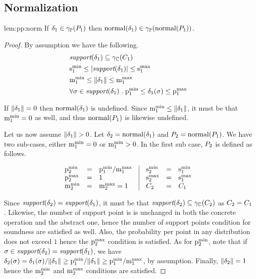 \subsection{Normalization}
\begin{replemma}{lem:pp:norm}
If $\delta_1 \in \gamma_{\mathbb{P}}(P_{1})$ then $\text{normal}(\delta_1) \in \gamma_{\mathbb{P}}(\text{normal}(P_{1}))$.
\end{replemma}

\begin{proof} By assumption we have the following.
\begin{align*}
& \textit{support}(\delta_1) \subseteq \gamma_{\mathbb{C}}(C_1) \\
& \mathrm{s}^\mathrm{min}_{1} \leq \left| \textit{support}(\delta_1) \right| \leq \mathrm{s}^\mathrm{max}_{1} \\
& \mathrm{m}^\mathrm{min}_{1} \leq \mathord{\parallel}\delta_1\mathord{\parallel} \leq \mathrm{m}^\mathrm{max}_{1} \\
& \forall \sigma \in \textit{support}(\delta_1) \;
. \; \mathrm{p}^\mathrm{min}_{1} \leq \delta_1(\sigma) \leq \mathrm{p}^\mathrm{max}_{1}
\end{align*}

If $ \mathord{\parallel}\delta_1\mathord{\parallel} = 0 $ then $ \text{normal}(\delta_1) $ is
undefined. Since $ \mathrm{m}^\mathrm{min}_{1} \leq \mathord{\parallel}\delta_1\mathord{\parallel} $, it must be that
$ \mathrm{m}^\mathrm{min}_{1} = 0 $ as well, and thus $ \text{normal}(P_{1}) $ is likewise undefined.

Let us now assume $ \mathord{\parallel}\delta_1\mathord{\parallel} > 0 $. Let $ \delta_2 = \text{normal}(\delta_1) $ and $ P_{2} = \text{normal}(P_{1})
$. We have two sub-cases,
either $ \mathrm{m}^\mathrm{min}_{1} = 0 $ or $ \mathrm{m}^\mathrm{min}_{1} > 0 $. In the first sub case,
$ P_{2} $ is defined as follows.

\[
\begin{array}{lcl@{\hspace{0.35cm}}|@{\hspace{0.35cm}}lcl}
\pmin{2} &=& \pmin{1} / \mmax{1} &
\smin{2} &=& \smin{1} \\
\pmax{2} &=& 1 &
\smax{2} &=& \smax{1} \\
\mmin{2} &=& \mmax{2} = 1 & \getpoly{2} &=& \getpoly{1} \\
\end{array}
\]

Since $ \textit{support}(\delta_2) = \textit{support}(\delta_1) $, it must be that
$ \textit{support}(\delta_2) \subseteq \gamma_{\mathbb{C}}(C_2) $ as $ C_2
= C_1 $. Likewise, the number of support point is is unchanged in
both the concrete operation and the abstract one, hence the number of
support points condition for soundness are satisfied as well. Also,
the probability per point in any distribution does not exceed $ 1 $
hence the $ \mathrm{p}^\mathrm{max}_{2} $ condition is satisfied. As for $ \mathrm{p}^\mathrm{min}_{2} $,
note that if $ \sigma \in \textit{support}(\delta_2) = \textit{support}(\delta_1) $,
we have $ \delta_2(\sigma) = \delta_1(\sigma)
/ \mathord{\parallel}\delta_1\mathord{\parallel} \geq \mathrm{p}^\mathrm{min}_{1} / \mathord{\parallel}\delta_1\mathord{\parallel} \geq \mathrm{p}^\mathrm{min}_{1}
/ \mathrm{m}^\mathrm{max}_{1} $, by assumption. Finally, $ \mathord{\parallel}\delta_2\mathord{\parallel} = 1 $ hence
the $ \mathrm{m}^\mathrm{min}_{2} $ and $ \mathrm{m}^\mathrm{max}_{2} $ conditions are satisfied.


\end{proof}
